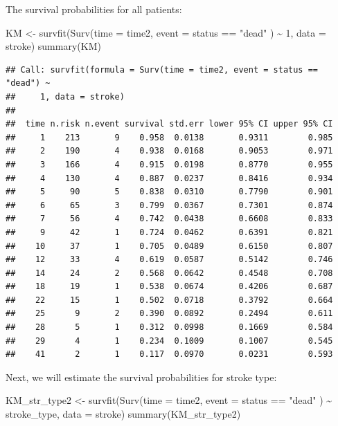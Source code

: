 \documentclass[
  10pt,
]{krantz}
\newenvironment{Shaded}{\begin{snugshade}}{\end{snugshade}}
\newcommand{\AttributeTok}[1]{\textcolor[rgb]{0.77,0.63,0.00}{#1}}
\newcommand{\DecValTok}[1]{\textcolor[rgb]{0.00,0.00,0.81}{#1}}
\newcommand{\FunctionTok}[1]{\textcolor[rgb]{0.00,0.00,0.00}{#1}}
\newcommand{\NormalTok}[1]{#1}
\newcommand{\OtherTok}[1]{\textcolor[rgb]{0.56,0.35,0.01}{#1}}
\newcommand{\SpecialCharTok}[1]{\textcolor[rgb]{0.00,0.00,0.00}{#1}}
\newcommand{\StringTok}[1]{\textcolor[rgb]{0.31,0.60,0.02}{#1}}
\begin{document}
The survival probabilities for all patients:

\begin{Shaded}
\begin{Highlighting}[]
\NormalTok{KM }\OtherTok{\textless{}{-}} \FunctionTok{survfit}\NormalTok{(}\FunctionTok{Surv}\NormalTok{(}\AttributeTok{time =}\NormalTok{ time2, }
                   \AttributeTok{event =}\NormalTok{ status }\SpecialCharTok{==} \StringTok{"dead"}\NormalTok{ ) }\SpecialCharTok{\textasciitilde{}} \DecValTok{1}\NormalTok{, }
              \AttributeTok{data =}\NormalTok{ stroke)}
\FunctionTok{summary}\NormalTok{(KM)}
\end{Highlighting}
\end{Shaded}

\begin{verbatim}
## Call: survfit(formula = Surv(time = time2, event = status == "dead") ~ 
##     1, data = stroke)
## 
##  time n.risk n.event survival std.err lower 95% CI upper 95% CI
##     1    213       9    0.958  0.0138       0.9311        0.985
##     2    190       4    0.938  0.0168       0.9053        0.971
##     3    166       4    0.915  0.0198       0.8770        0.955
##     4    130       4    0.887  0.0237       0.8416        0.934
##     5     90       5    0.838  0.0310       0.7790        0.901
##     6     65       3    0.799  0.0367       0.7301        0.874
##     7     56       4    0.742  0.0438       0.6608        0.833
##     9     42       1    0.724  0.0462       0.6391        0.821
##    10     37       1    0.705  0.0489       0.6150        0.807
##    12     33       4    0.619  0.0587       0.5142        0.746
##    14     24       2    0.568  0.0642       0.4548        0.708
##    18     19       1    0.538  0.0674       0.4206        0.687
##    22     15       1    0.502  0.0718       0.3792        0.664
##    25      9       2    0.390  0.0892       0.2494        0.611
##    28      5       1    0.312  0.0998       0.1669        0.584
##    29      4       1    0.234  0.1009       0.1007        0.545
##    41      2       1    0.117  0.0970       0.0231        0.593
\end{verbatim}

Next, we will estimate the survival probabilities for stroke type:

\begin{Shaded}
\begin{Highlighting}[]
\NormalTok{KM\_str\_type2 }\OtherTok{\textless{}{-}} \FunctionTok{survfit}\NormalTok{(}\FunctionTok{Surv}\NormalTok{(}\AttributeTok{time =}\NormalTok{ time2, }
                             \AttributeTok{event =}\NormalTok{ status }\SpecialCharTok{==} \StringTok{"dead"}\NormalTok{ ) }\SpecialCharTok{\textasciitilde{}}\NormalTok{ stroke\_type, }
                        \AttributeTok{data =}\NormalTok{ stroke)}
\FunctionTok{summary}\NormalTok{(KM\_str\_type2)}
\end{Highlighting}
\end{Shaded}
\end{document}
